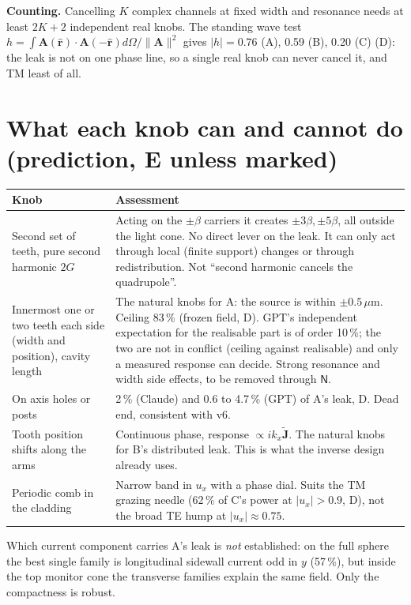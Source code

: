 \documentclass[11pt,a4paper]{article}
\begin{document}
\textbf{Counting.} Cancelling $K$ complex channels at fixed width and resonance needs at least $2K+2$ independent
real knobs. The standing wave test $h=\int\mathbf A(\hat{\mathbf r})\cdot\mathbf A(-\hat{\mathbf r})d\Omega/\|\mathbf A\|^2$ gives
$|h|=0.76$ (A), 0.59 (B), 0.20 (C) (D): the leak is not on one phase line, so a single real knob can never cancel
it, and TM least of all.

\section{What each knob can and cannot do (prediction, E unless marked)}
\begin{center}\begin{tabular}{p{3.6cm}p{10.0cm}}\hline
Knob & Assessment\\\hline
Second set of teeth, pure second harmonic $2G$ & Acting on the $\pm\beta$ carriers it creates $\pm3\beta,\pm5\beta$,
all outside the light cone. No direct lever on the leak. It can only act through local (finite support) changes or
through redistribution. Not ``second harmonic cancels the quadrupole''.\\
Innermost one or two teeth each side (width and position), cavity length & The natural knobs for A: the source
is within $\pm0.5$\,$\mu$m. Ceiling 83\,\% (frozen field, D). GPT's independent expectation for the
realisable part is of order 10\,\%; the two are not in conflict (ceiling against realisable) and only a measured
response can decide. Strong resonance and width side effects, to be removed through $\mathsf N$.\\
On axis holes or posts & 2\,\% (Claude) and 0.6 to 4.7\,\% (GPT) of A's leak, D. Dead end, consistent with v6.\\
Tooth position shifts along the arms & Continuous phase, response $\propto ik_x\tilde{\mathbf J}$. The natural
knobs for B's distributed leak. This is what the inverse design already uses.\\
Periodic comb in the cladding & Narrow band in $u_x$ with a phase dial. Suits the TM grazing needle (62\,\% of C's
power at $|u_x|>0.9$, D), not the broad TE hump at $|u_x|\approx0.75$.\\\hline
\end{tabular}\end{center}
Which current component carries A's leak is \emph{not} established: on the full sphere the best single family is
longitudinal sidewall current odd in $y$ (57\,\%), but inside the top monitor cone the transverse families explain
the same field. Only the compactness is robust.
\end{document}
